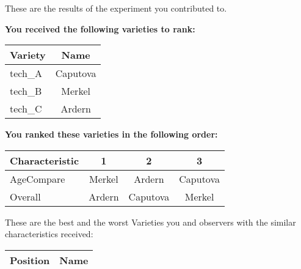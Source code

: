 \documentclass[10pt]{article}
\begin{document}
\begin{titlepage}
	These are the results of the experiment you contributed to.

	\begin{flushleft}
		\textbf{You received the following varieties to rank: }\hfill \break
		\begin{tabularx}{\textwidth}{ X | c  }
			\hline
			\textbf{Variety} & \textbf{Name} \\ \hline

			
				tech\_A & Caputova \\ \hline
			
				tech\_B & Merkel \\ \hline
			
				tech\_C & Ardern \\ \hline
			


		\end{tabularx}\newline \newline

		\textbf{You ranked these varieties in the following order: }\hfill \break
		\begin{tabularx}{\textwidth}{ X | c | c | c  }
			\hline
			\textbf{Characteristic}
			
				& \textbf{ 1 }
			
				& \textbf{ 2 }
			
				& \textbf{ 3 }
			
			\\ \hline


			
				AgeCompare & Merkel  & Ardern  & Caputova  \\ \hline


			
				Overall & Ardern  & Caputova  & Merkel  \\ \hline


			

		\end{tabularx}

	\end{flushleft}

	\pagebreak

	\begin{flushleft}
		These are the best and the worst Varieties you and observers with the similar characteristics received:\hfill \break \newline
		\begin{tabularx}{\textwidth}{ X | X  }
			\hline
			\textbf{Position} & \textbf{Name} \\ \hline


\end{tabularx}
\end{flushleft}
\end{titlepage}
\end{document}
